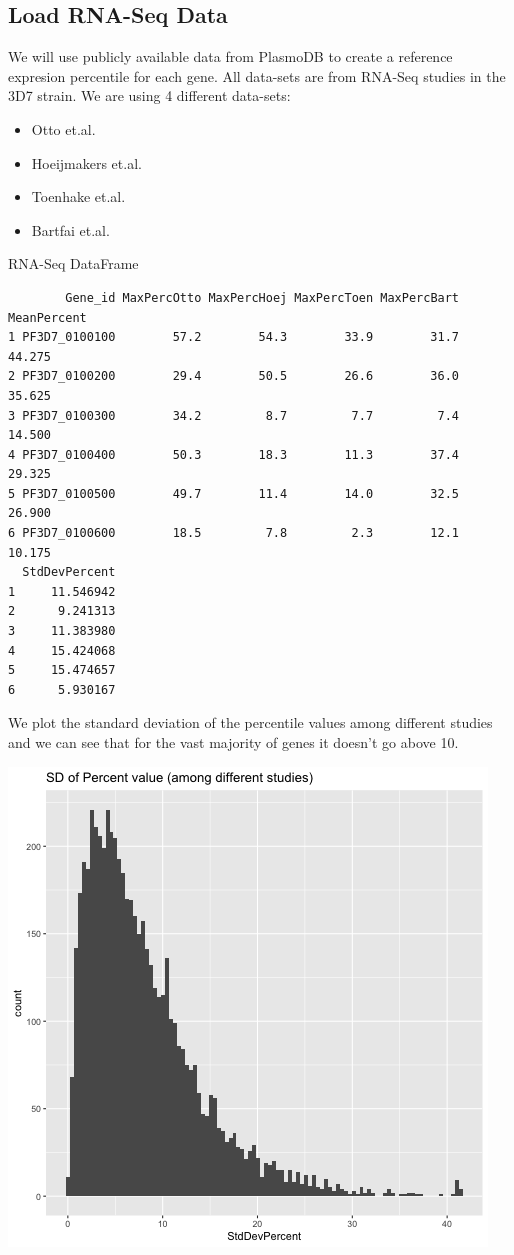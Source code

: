 \documentclass[11pt]{article}
\begin{document}
\subsection{Load RNA-Seq Data}
\label{sec:org8657e6b}
We will use publicly available data from PlasmoDB to create a reference expresion percentile for each gene.
All data-sets are from RNA-Seq studies in the 3D7 strain.
We are using 4 different data-sets:
\begin{itemize}
\item Otto et.al.
\item Hoeijmakers et.al.
\item Toenhake et.al.
\item Bartfai et.al.
\end{itemize}

RNA-Seq DataFrame
\begin{verbatim}
        Gene_id MaxPercOtto MaxPercHoej MaxPercToen MaxPercBart MeanPercent
1 PF3D7_0100100        57.2        54.3        33.9        31.7      44.275
2 PF3D7_0100200        29.4        50.5        26.6        36.0      35.625
3 PF3D7_0100300        34.2         8.7         7.7         7.4      14.500
4 PF3D7_0100400        50.3        18.3        11.3        37.4      29.325
5 PF3D7_0100500        49.7        11.4        14.0        32.5      26.900
6 PF3D7_0100600        18.5         7.8         2.3        12.1      10.175
  StdDevPercent
1     11.546942
2      9.241313
3     11.383980
4     15.424068
5     15.474657
6      5.930167
\end{verbatim}

We plot the standard deviation of the percentile values among different studies and we can see that for the vast majority of genes it doesn't go above 10.
\begin{center}
\includegraphics[width=.9\linewidth]{./Plots/rnaseq_perc_sd.png}
\end{center}
\end{document}
